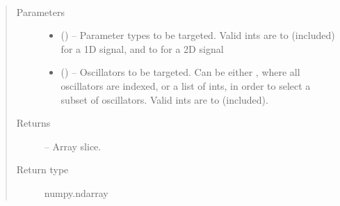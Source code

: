 \documentclass[letterpaper,10pt,english]{sphinxmanual}
\begin{document}
\begin{fulllineitems}
\begin{fulllineitems}
\end{fulllineitems}


\begin{fulllineitems}
\label{\detokenize{references/nlp/nlp:nmrespy.nlp.nlp.NonlinearProgramming._get_slice}}~\begin{quote}\begin{description}
\item[{Parameters}] \leavevmode\begin{itemize}
\item {} 
\sphinxAtStartPar
{} () – Parameter types to be targeted. Valid ints are  to 
(included) for a 1D signal, and  to  for a 2D signal

\item {} 
\sphinxAtStartPar
{} () – Oscillators to be targeted. Can be either , where all
oscillators are indexed, or a list of ints, in order to select
a subset of oscillators. Valid ints are  to 
(included).

\end{itemize}

\item[{Returns}] \leavevmode
\sphinxAtStartPar
{} – Array slice.

\item[{Return type}] \leavevmode
\sphinxAtStartPar
numpy.ndarray

\end{description}\end{quote}

\end{fulllineitems}



\end{fulllineitems}
\end{document}
